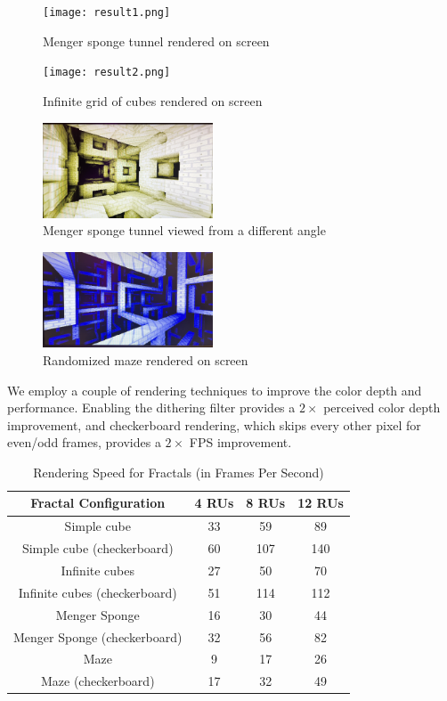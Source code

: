 \documentclass[conference]{IEEEtran}
\begin{document}
\begin{figure}[htpb]
\centerline{\texttt{[image: result1.png]}}
\caption{Menger sponge tunnel rendered on screen}
\label{result1}
\end{figure}

\begin{figure}[htpb]
\centerline{\texttt{[image: result2.png]}}
\caption{Infinite grid of cubes rendered on screen}
\label{result2}
\end{figure}

\begin{figure}[htpb]
\centerline{\includegraphics[width=0.45\textwidth]{result3.jpg}}
\caption{Menger sponge tunnel viewed from a different angle}
\label{result3}
\end{figure}

\begin{figure}[htpb]
\centerline{\includegraphics[width=0.45\textwidth]{result4.jpg}}
\caption{Randomized maze rendered on screen}
\label{result4}
\end{figure}


We employ a couple of rendering techniques to improve the color depth and performance. Enabling the dithering filter provides a $2 \times$ perceived color depth improvement, and checkerboard rendering, which skips every other pixel for even/odd frames, provides a $2 \times$ FPS improvement.

\begin{table}[!t]
\renewcommand{\arraystretch}{1.3}
\caption{Rendering Speed for Fractals (in Frames Per Second)}
\label{table-speed}
\centering
\begin{tabular}{c||c|c|c}
\hline
\bfseries Fractal Configuration & \bfseries 4 RUs & \bfseries 8 RUs & \bfseries 12 RUs \\
\hline\hline
Simple cube & 33 & 59 & 89 \\
Simple cube (checkerboard) & 60 & 107 & 140 \\
Infinite cubes & 27 & 50 & 70 \\
Infinite cubes (checkerboard) & 51 & 114 & 112 \\
Menger Sponge &16 & 30 & 44 \\
Menger Sponge (checkerboard) & 32 & 56 & 82 \\
Maze & 9 & 17 & 26 \\
Maze (checkerboard) & 17 & 32 & 49 \\

\hline
\end{tabular}
\end{table}
\end{document}

